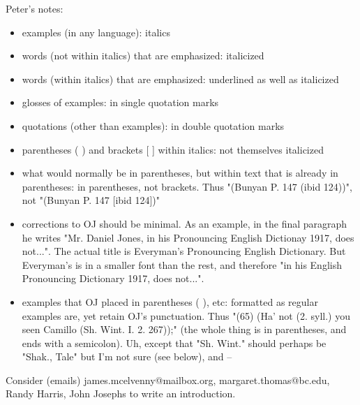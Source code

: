 Peter's notes:
\begin{itemize}
    \item examples (in any language): italics
    \item words (not within italics) that are emphasized: italicized
    \item words (within italics) that are emphasized: underlined as well as italicized
    \item glosses of examples: in single quotation marks
    \item quotations (other than examples): in double quotation marks
    \item parentheses ( ) and brackets [ ] within italics: not themselves italicized
    \item what would normally be in parentheses, but within text that is already in parentheses: in parentheses, not brackets. Thus "(Bunyan P. 147 (ibid 124))", not "(Bunyan P. 147 [ibid 124])"
    \item corrections to OJ should be minimal. As an example, in the final paragraph he writes "Mr. Daniel Jones, in his Pronouncing English Dictionay 1917, does not...". The actual title is Everyman's Pronouncing English Dictionary. But Everyman's is in a smaller font than the rest, and therefore "in his English Pronouncing Dictionary 1917, does not...".
    \item examples that OJ placed in parentheses ( ), etc: formatted as regular examples are, yet retain OJ's punctuation. Thus "(65) (Ha’ not (2. syll.) you seen Camillo (Sh. Wint. I. 2. 267));" (the whole thing is in parentheses, and ends with a semicolon). Uh, except that "Sh. Wint." should perhaps be "Shak., Tale" but I'm not sure (see below), and --
\end{itemize}


Consider (emails) james.mcelvenny@mailbox.org, margaret.thomas@bc.edu, Randy Harris, John Josephs to write an introduction.